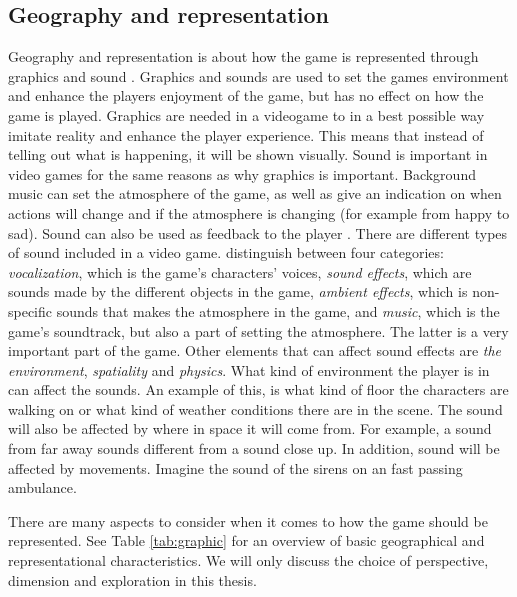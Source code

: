 \subsection{Geography and representation}
Geography and representation is about how the game is represented through graphics and sound \cite{understandingvg}. Graphics and sounds are used to set the games environment and enhance the players enjoyment of the game, but has no effect on how the game is played. Graphics are needed in a videogame to in a best possible way imitate reality and enhance the player experience. This means that instead of telling out what is happening, it will be shown visually. Sound is important in video games for the same reasons as why graphics is important. Background music can set the atmosphere of the game, as well as give an indication on when actions will change and if the atmosphere is changing (for example from happy to sad). Sound can also be used as feedback to the player \cite{umlapproach}. There are different types of sound included in a  video game. \cite{understandingvg} distinguish between four categories:
\emph{vocalization}, which is the game’s characters’ voices,
\emph{sound effects}, which are sounds made by the different objects in the game, \emph{ambient effects}, which is non-specific sounds that makes the atmosphere in the game, and \emph{music}, which is the game’s soundtrack, but also a part of setting the atmosphere. The latter is a very important part of the game. Other elements that can affect sound effects are \emph{the environment}, \emph{spatiality} and \emph{physics}. What kind of environment the player is in can affect the  sounds. An example of this, is what kind of floor the characters are walking on or what kind of weather conditions there are in the scene. The sound will also be affected by where in space it will come from. For example, a sound from far away sounds different from a sound close up. In addition, sound will be affected by movements. Imagine the sound of the sirens on an fast passing ambulance.

There are many aspects to consider when it comes to how the game should be represented. See Table \ref{tab:graphic} for an overview of basic geographical and representational characteristics. We will only discuss the choice of perspective, dimension and exploration in this thesis. 

